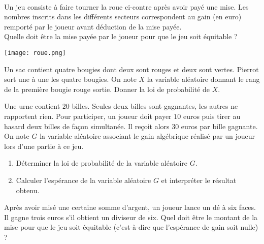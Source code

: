 \documentclass[11pt]{article}
\begin{document}
\begin{exo}~\\[-7mm]
  \begin{minipage}{.6\textwidth}
    Un jeu consiste à faire tourner la roue ci-contre après avoir payé une mise.
    Les nombres inscrits dans les différents secteurs correspondent au gain (en
    euro) remporté par le joueur avant déduction de la mise payée.\\
    Quelle doit être la mise payée par le joueur pour que le jeu soit équitable
    ?
  \end{minipage}
  \begin{minipage}{.4\textwidth}
    \begin{center}
      \texttt{[image: roue.png]}
    \end{center}
  \end{minipage}
\end{exo}

\begin{exo}
  Un sac contient quatre bougies dont deux sont rouges et deux sont vertes.
  Pierrot sort une à une les quatre bougies. On note $X$ la variable aléatoire
  donnant le rang de la première bougie rouge sortie. Donner la loi de
  probabilité de $X$.
\end{exo}


\begin{exo}
  Une urne contient $20$ billes. Seules deux billes sont gagnantes, les autres
  ne rapportent rien. Pour participer, un joueur doit payer $10$ euros puis
  tirer au hasard deux billes de façon simultanée. Il reçoit alors $30$ euros
  par bille gagnante. On note $G$ la variable aléatoire associant le gain
  algébrique réalisé par un joueur lors d'une partie à ce jeu.
  \begin{enumerate}
    \item Déterminer la loi de probabilité de la variable aléatoire $G$.
    \item Calculer l'espérance de la variable aléatoire $G$ et interpréter le
      résultat obtenu.
  \end{enumerate}
\end{exo}

\begin{exo}
  Après avoir misé une certaine somme d'argent, un joueur lance un dé à six
  faces. Il gagne trois euros s'il obtient un diviseur de six. Quel doit être le
  montant de la mise pour que le jeu soit équitable (c'est-à-dire que
  l'espérance de gain soit nulle) ?
\end{exo}
\end{document}
